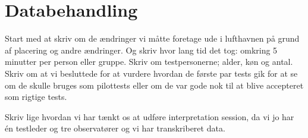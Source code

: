 \chapter{Databehandling}
\label{ParametreDatabehandling}
%
Start med at skriv om de ændringer vi måtte foretage ude i lufthavnen på grund af placering og andre ændringer. Og skriv hvor lang tid det tog: omkring 5 minutter per person eller gruppe. Skriv om testpersonerne; alder, køn og antal. Skriv om at vi besluttede for at vurdere hvordan de første par tests gik for at se om de skulle bruges som pilottests eller om de var gode nok til at blive accepteret som rigtige tests. 


Skriv lige hvordan vi har tænkt os at udføre interpretation session, da vi jo har én testleder og tre observatører og vi har transkriberet data. 